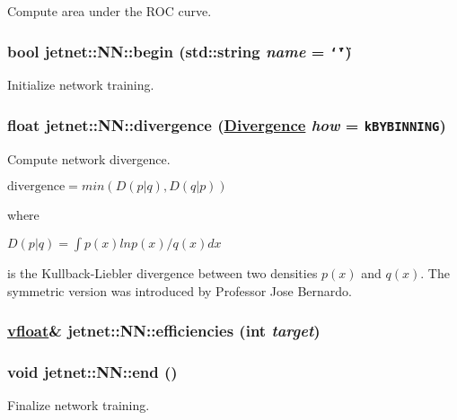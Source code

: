 Compute area under the ROC curve. 

\hypertarget{classjetnet_1_1NN_a21}{
\subsubsection[begin]{\setlength{\rightskip}{0pt plus 5cm}bool jetnet::NN::begin (std::string {\em name} = {\tt \char`\"{}\char`\"{}})}}
\label{classjetnet_1_1NN_a21}


Initialize network training. 

\hypertarget{classjetnet_1_1NN_a27}{
\subsubsection[divergence]{\setlength{\rightskip}{0pt plus 5cm}float jetnet::NN::divergence (\hyperlink{classjetnet_1_1NN_w16}{Divergence} {\em how} = {\tt kBYBINNING})}}
\label{classjetnet_1_1NN_a27}


Compute network divergence. 

$\mbox{divergence} = min(D(p|q), D(q|p)) $

where

$D(p|q) = \int p(x) ln p(x) / q(x) dx $

is the Kullback-Liebler divergence between two densities $p(x)$ and $q(x)$. The symmetric version was introduced by Professor Jose Bernardo. \hypertarget{classjetnet_1_1NN_a30}{
\subsubsection[efficiencies]{\setlength{\rightskip}{0pt plus 5cm}\hyperlink{jetnet_8hpp_a0}{vfloat}\& jetnet::NN::efficiencies (int {\em target})}}
\label{classjetnet_1_1NN_a30}


\hypertarget{classjetnet_1_1NN_a22}{
\subsubsection[end]{\setlength{\rightskip}{0pt plus 5cm}void jetnet::NN::end ()}}
\label{classjetnet_1_1NN_a22}


Finalize network training. 

